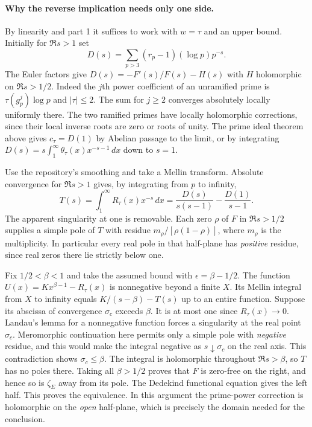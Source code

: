 \paragraph{Why the reverse implication needs only one side.}
By linearity and part 1 it suffices to work with $w=\tau$ and an upper
bound. Initially for $\Re s>1$ set
\[
 D(s)=\sum_{p>3}(r_p-1)(\log p)p^{-s}.
\]
The Euler factors give $D(s)=-F'(s)/F(s)-H(s)$ with $H$ holomorphic
on $\Re s>1/2$. Indeed the $j$th power coefficient of an unramified
prime is $\tau(g_p^j)\log p$ and $|\tau|\le2$. The sum for $j\ge2$
converges absolutely locally uniformly there. The two ramified primes
have locally holomorphic corrections, since their local inverse roots are
zero or roots of unity. The prime ideal theorem above gives
$c_\tau=D(1)$ by Abelian passage to the limit, or by integrating
$D(s)=s\int_1^\infty\theta_\tau(x)x^{-s-1}\,dx$ down to $s=1$.

Use the repository's smoothing and take a Mellin transform. Absolute convergence for
$\Re s>1$ gives, by integrating from $p$ to infinity,
\[
 T(s)=\int_1^\infty R_\tau(x)x^{-s}\,dx
      =\frac{D(s)}{s(s-1)}-\frac{D(1)}{s-1}.
\]
The apparent singularity at one is removable. Each zero $\rho$ of $F$ in
$\Re s>1/2$ supplies a simple pole of $T$ with residue
$m_\rho/[\rho(1-\rho)]$, where $m_\rho$ is the multiplicity. In particular
every real pole in that half-plane has \emph{positive} residue, since real
zeros there lie strictly below one.

Fix $1/2<\beta<1$ and take the assumed bound with $\epsilon=\beta-1/2$.
The function $U(x)=K x^{\beta-1}-R_\tau(x)$ is nonnegative beyond a finite
$X$. Its Mellin integral from $X$ to infinity equals
$K/(s-\beta)-T(s)$ up to an entire function. Suppose its abscissa of
convergence $\sigma_c$ exceeds $\beta$. It is at most one since
$R_\tau(x)\to0$. Landau's lemma for a nonnegative function forces a
singularity at the real point $\sigma_c$. Meromorphic continuation here
permits only a simple pole with \emph{negative} residue, and this would make
the integral negative as $s\downarrow\sigma_c$ on the real axis. This
contradiction shows $\sigma_c\le\beta$. The integral is holomorphic
throughout $\Re s>\beta$, so $T$ has no poles there. Taking all $\beta>1/2$
proves that $F$ is zero-free on the right, and hence so is $\zeta_E$ away
from its pole. The Dedekind functional equation gives the left half.
This proves the equivalence. In this argument the prime-power correction
is holomorphic on the \emph{open} half-plane, which is precisely the
domain needed for the conclusion.

